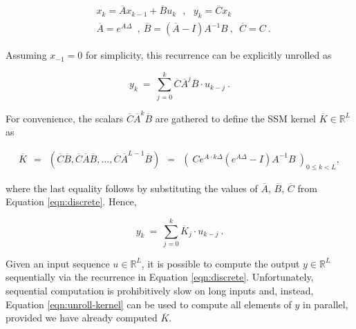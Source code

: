 \begin{equation}\label{eqn:discrete}
\begin{split}
&x_k = \overline{A}x_{k-1} + \overline{B}u_k\ \ \ ,\ \ \ y_k = \overline{C}x_k  \\[5pt]
&\overline{A} = e^{A\Delta}\ \;,\ \overline{B} = (\overline{A} - I)A^{-1}B\ ,\ \;\overline{C} = C\ .
\end{split}
\end{equation}

Assuming $x_{-1} = 0$ for simplicity, this recurrence can be explicitly unrolled as

\begin{equation}\label{eqn:unroll}
y_k \ = \ \sum_{j=0}^k \overline{C}\overline{A}^j\overline{B}\cdot u_{k-j}\ .
\end{equation}

 
For convenience, the scalars $\overline{C}\overline{A}^k\overline{B}$ are gathered to define the SSM kernel $\overline{K} \in \mathbb{R}^L$ as

\begin{equation}\label{eqn:kernel}
\begin{split}
\overline{K} \ \ = \ \ (\overline{C}\overline{B}, \overline{C}\overline{A}\overline{B}, \ldots, \overline{C}\overline{A}^{L-1}\overline{B}) \ \ =\ \ (\ C e^{A\cdot k\Delta} (e^{A\Delta} - I)A^{-1}B\ )_{0 \leq k < L},
\end{split}
\end{equation}

where the last equality follows by substituting the values of $\overline{A}$, $\overline{B}$, $\overline{C}$ from Equation \ref{eqn:discrete}. Hence,

\begin{equation}\label{eqn:unroll-kernel}
y_k \ = \ \sum_{j=0}^k \overline{K}_j\cdot u_{k-j}\ .
\end{equation}

Given an input sequence $u \in \mathbb{R}^L$, it is possible to compute the output $y \in \mathbb{R}^L$ sequentially via the recurrence in Equation \ref{eqn:discrete}. Unfortunately, sequential computation is prohibitively slow on long inputs and, instead, Equation \ref{eqn:unroll-kernel} can be used to compute all elements of $y$ in parallel, provided we have already computed $\overline{K}$.

